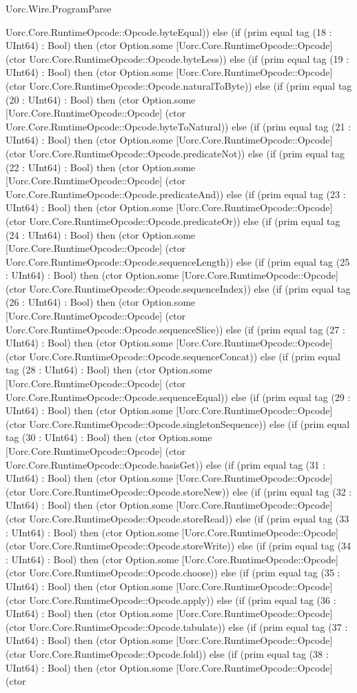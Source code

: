 \begin{lexlean}{Uorc.Wire.ProgramParse}
\begin{semanticmodule}
{Uorc.Core.RuntimeOpcode::Opcode.byteEqual)) else (if (prim equal tag (18 : UInt64) : Bool) then (ctor Option.some [Uorc.Core.RuntimeOpcode::Opcode] (ctor Uorc.Core.RuntimeOpcode::Opcode.byteLess)) else (if (prim equal tag (19 : UInt64) : Bool) then (ctor Option.some [Uorc.Core.RuntimeOpcode::Opcode] (ctor Uorc.Core.RuntimeOpcode::Opcode.naturalToByte)) else (if (prim equal tag (20 : UInt64) : Bool) then (ctor Option.some [Uorc.Core.RuntimeOpcode::Opcode] (ctor Uorc.Core.RuntimeOpcode::Opcode.byteToNatural)) else (if (prim equal tag (21 : UInt64) : Bool) then (ctor Option.some [Uorc.Core.RuntimeOpcode::Opcode] (ctor Uorc.Core.RuntimeOpcode::Opcode.predicateNot)) else (if (prim equal tag (22 : UInt64) : Bool) then (ctor Option.some [Uorc.Core.RuntimeOpcode::Opcode] (ctor Uorc.Core.RuntimeOpcode::Opcode.predicateAnd)) else (if (prim equal tag (23 : UInt64) : Bool) then (ctor Option.some [Uorc.Core.RuntimeOpcode::Opcode] (ctor Uorc.Core.RuntimeOpcode::Opcode.predicateOr)) else (if (prim equal tag (24 : UInt64) : Bool) then (ctor Option.some [Uorc.Core.RuntimeOpcode::Opcode] (ctor Uorc.Core.RuntimeOpcode::Opcode.sequenceLength)) else (if (prim equal tag (25 : UInt64) : Bool) then (ctor Option.some [Uorc.Core.RuntimeOpcode::Opcode] (ctor Uorc.Core.RuntimeOpcode::Opcode.sequenceIndex)) else (if (prim equal tag (26 : UInt64) : Bool) then (ctor Option.some [Uorc.Core.RuntimeOpcode::Opcode] (ctor Uorc.Core.RuntimeOpcode::Opcode.sequenceSlice)) else (if (prim equal tag (27 : UInt64) : Bool) then (ctor Option.some [Uorc.Core.RuntimeOpcode::Opcode] (ctor Uorc.Core.RuntimeOpcode::Opcode.sequenceConcat)) else (if (prim equal tag (28 : UInt64) : Bool) then (ctor Option.some [Uorc.Core.RuntimeOpcode::Opcode] (ctor Uorc.Core.RuntimeOpcode::Opcode.sequenceEqual)) else (if (prim equal tag (29 : UInt64) : Bool) then (ctor Option.some [Uorc.Core.RuntimeOpcode::Opcode] (ctor Uorc.Core.RuntimeOpcode::Opcode.singletonSequence)) else (if (prim equal tag (30 : UInt64) : Bool) then (ctor Option.some [Uorc.Core.RuntimeOpcode::Opcode] (ctor Uorc.Core.RuntimeOpcode::Opcode.basisGet)) else (if (prim equal tag (31 : UInt64) : Bool) then (ctor Option.some [Uorc.Core.RuntimeOpcode::Opcode] (ctor Uorc.Core.RuntimeOpcode::Opcode.storeNew)) else (if (prim equal tag (32 : UInt64) : Bool) then (ctor Option.some [Uorc.Core.RuntimeOpcode::Opcode] (ctor Uorc.Core.RuntimeOpcode::Opcode.storeRead)) else (if (prim equal tag (33 : UInt64) : Bool) then (ctor Option.some [Uorc.Core.RuntimeOpcode::Opcode] (ctor Uorc.Core.RuntimeOpcode::Opcode.storeWrite)) else (if (prim equal tag (34 : UInt64) : Bool) then (ctor Option.some [Uorc.Core.RuntimeOpcode::Opcode] (ctor Uorc.Core.RuntimeOpcode::Opcode.choose)) else (if (prim equal tag (35 : UInt64) : Bool) then (ctor Option.some [Uorc.Core.RuntimeOpcode::Opcode] (ctor Uorc.Core.RuntimeOpcode::Opcode.apply)) else (if (prim equal tag (36 : UInt64) : Bool) then (ctor Option.some [Uorc.Core.RuntimeOpcode::Opcode] (ctor Uorc.Core.RuntimeOpcode::Opcode.tabulate)) else (if (prim equal tag (37 : UInt64) : Bool) then (ctor Option.some [Uorc.Core.RuntimeOpcode::Opcode] (ctor Uorc.Core.RuntimeOpcode::Opcode.fold)) else (if (prim equal tag (38 : UInt64) : Bool) then (ctor Option.some [Uorc.Core.RuntimeOpcode::Opcode] (ctor }
\end{semanticmodule}
\end{lexlean}
